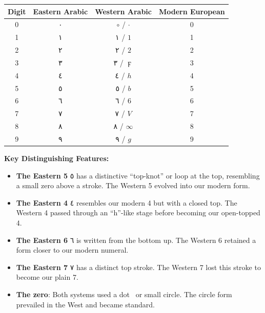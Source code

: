 \documentclass[11pt,a4paper]{article}
\newcommand{\ar}[1]{{\arabicfont #1}}
\begin{document}
\begin{center}
\renewcommand{\arraystretch}{1.6}
\begin{tabular}{|c|c|c|c|}
\hline
\rowcolor{tableheader}
\textbf{Digit} & \textbf{Eastern Arabic} & \textbf{Western Arabic} & \textbf{Modern European} \\
\hline
0 & \ar{٠} & $\circ$ / $\cdot$ & 0 \\
\hline
1 & \ar{١} & \ar{١} / $1$ & 1 \\
\hline
2 & \ar{٢} & \ar{٢} / $\mathfrak{2}$ & 2 \\
\hline
3 & \ar{٣} & \ar{٣} / $\digamma$ & 3 \\
\hline
4 & \ar{٤} & \ar{٤} / $h$ & 4 \\
\hline
5 & \ar{٥} & \ar{٥} / $b$ & 5 \\
\hline
6 & \ar{٦} & \ar{٦} / $6$ & 6 \\
\hline
7 & \ar{٧} & \ar{٧} / $V$ & 7 \\
\hline
8 & \ar{٨} & \ar{٨} / $\infty$ & 8 \\
\hline
9 & \ar{٩} & \ar{٩} / $g$ & 9 \\
\hline
\end{tabular}
\end{center}

\vspace{1em}
\textbf{Key Distinguishing Features:}

\begin{itemize}[leftmargin=1.5em,itemsep=3pt]
  \item \textbf{The Eastern 5} \ar{٥} has a distinctive ``top-knot'' or loop at the top, resembling a small zero above a stroke. The Western 5 evolved into our modern form.

  \item \textbf{The Eastern 4} \ar{٤} resembles our modern 4 but with a closed top. The Western 4 passed through an ``h''-like stage before becoming our open-topped 4.

  \item \textbf{The Eastern 6} \ar{٦} is written from the bottom up. The Western 6 retained a form closer to our modern numeral.

  \item \textbf{The Eastern 7} \ar{٧} has a distinct top stroke. The Western 7 lost this stroke to become our plain 7.

  \item \textbf{The zero}: Both systems used a dot \textperiodcentered\ or small circle. The circle form prevailed in the West and became standard.
\end{itemize}
\end{document}
